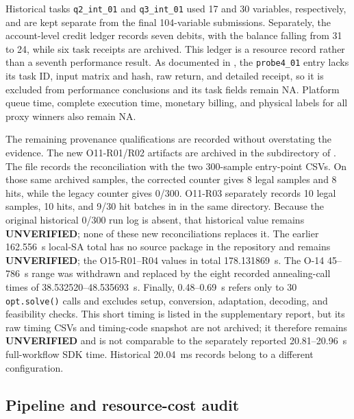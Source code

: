 Historical tasks \texttt{q2\_int\_01} and \texttt{q3\_int\_01} used 17
and 30 variables, respectively, and are kept separate from the final
104-variable submissions.  Separately, the account-level credit ledger
records seven debits, with the balance falling from 31 to 24, while six
task receipts are archived.  This ledger is a resource record rather than
a seventh performance result.  As documented in
, the \texttt{probe4\_01} entry lacks its task
ID, input matrix and hash, raw return, and detailed receipt, so it is
excluded from performance conclusions and its task fields remain NA.
Platform queue time, complete execution time, monetary
billing, and physical labels for all proxy winners also remain NA.

The remaining provenance qualifications are recorded without
overstating the evidence.  The new O11-R01/R02 artifacts are archived in
the  subdirectory of
.  The file
 records the reconciliation with the two
300-sample entry-point CSVs.  On those same archived samples, the corrected
counter gives 8 legal samples and 8 hits, while the legacy counter gives
0/300.  O11-R03 separately records 10 legal samples, 10 hits, and 9/30
hit batches in  in the same directory.
Because the original historical 0/300 run log is absent, that historical
value remains \textbf{UNVERIFIED}; none of these new reconciliations replaces
it.  The earlier 162.556~s local-SA total has no source package in the
repository and remains \textbf{UNVERIFIED}; the O15-R01--R04 values in
\allowbreak{} total 178.131869~s.  The O-14 45--786~s range was withdrawn
and replaced by the eight recorded annealing-call times of
38.532520--48.535693~s.  Finally, 0.48--0.69~s refers only to 30
\texttt{opt.solve()} calls and excludes setup, conversion, adaptation,
decoding, and feasibility checks.  This short timing is listed in the
supplementary report, but its raw timing CSVs and timing-code snapshot are
not archived; it therefore remains \textbf{UNVERIFIED} and is not comparable
to the separately reported 20.81--20.96~s full-workflow SDK time.
Historical 20.04~ms
records belong to a different configuration.

\subsection{Pipeline and resource-cost audit}
\label{sec:appendix-cost-audit}


